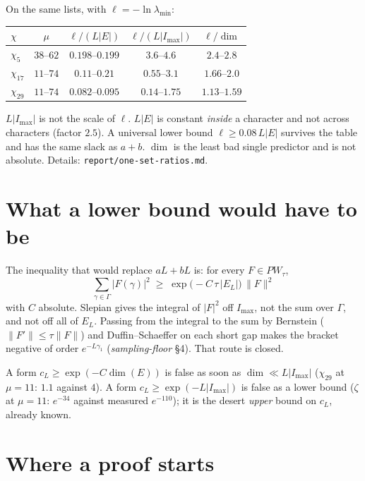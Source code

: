 \documentclass[11pt]{article}
\theoremstyle{remark}\newtheorem*{remark}{Remark}
\begin{document}
On the same lists, with \(\ell=-\ln\lambda_{\min}\):

\begin{center}\small
\begin{tabular}{lcccc}\toprule
\(\chi\) & \(\mu\) & \(\ell/(L|E|)\) & \(\ell/(L|I_{\max}|)\) & \(\ell/\dim\)\\\midrule
\(\chi_5\) & \(38\)--\(62\) & \(0.198\)--\(0.199\) & \(3.6\)--\(4.6\) & \(2.4\)--\(2.8\)\\
\(\chi_{17}\) & \(11\)--\(74\) & \(0.11\)--\(0.21\) & \(0.55\)--\(3.1\) & \(1.66\)--\(2.0\)\\
\(\chi_{29}\) & \(11\)--\(74\) & \(0.082\)--\(0.095\) & \(0.14\)--\(1.75\) & \(1.13\)--\(1.59\)\\\bottomrule
\end{tabular}
\end{center}

\(L|I_{\max}|\) is not the scale of \(\ell\). \(L|E|\) is constant
\emph{inside} a character and not across characters (factor \(2.5\)).
A universal lower bound \(\ell\ge 0.08\,L|E|\) survives the table and
has the same slack as \(a+b\). \(\dim\) is the least bad single
predictor and is not absolute. Details:
\texttt{report/one-set-ratios.md}.

\section{What a lower bound would have to be}

The inequality that would replace \(aL+bL\) is: for every
\(F\in PW_\tau\),
\[
\sum_{\gamma\in\Gamma}|F(\gamma)|^2
\;\ge\;
\exp\bigl(-C\,\tau\,|E_L|\bigr)\,\|F\|^2
\]
with \(C\) absolute. Slepian gives the integral of \(|F|^2\) off
\(I_{\max}\), not the sum over \(\Gamma\), and not off all of \(E_L\).
Passing from the integral to the sum by Bernstein
(\(\|F'\|\le\tau\|F\|\)) and Duffin--Schaeffer on each short gap makes
the bracket negative of order \(e^{-L\gamma_1}\)
(\emph{sampling-floor} §4). That route is closed.

A form \(c_L\ge\exp(-C\dim(E))\) is false as soon as
\(\dim\ll L|I_{\max}|\) (\(\chi_{29}\) at \(\mu=11\): \(1.1\) against
\(4\)). A form \(c_L\ge\exp(-L|I_{\max}|)\) is false as a lower bound
(\(\zeta\) at \(\mu=11\): \(e^{-34}\) against measured \(e^{-110}\));
it is the desert \emph{upper} bound on \(c_L\), already known.

\section{Where a proof starts}
\end{document}
